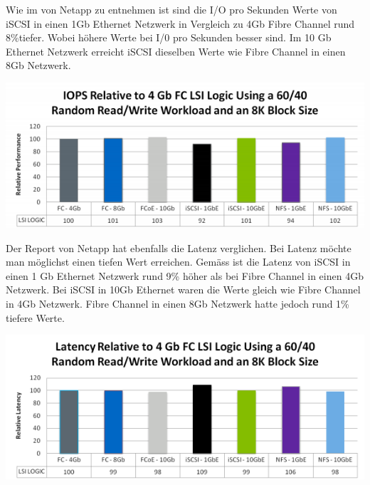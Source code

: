 Wie im  von Netapp zu entnehmen ist sind die I/O pro Sekunden Werte von iSCSI in einen 1Gb Ethernet Netzwerk in Vergleich zu 4Gb Fibre Channel rund 8\%tiefer. Wobei höhere Werte bei I/0 pro Sekunden besser sind. Im 10 Gb Ethernet Netzwerk erreicht iSCSI dieselben Werte wie Fibre Channel in einen 8Gb Netzwerk.\cite{Jafri2011}

\begin{center}
\includegraphics[width=\linewidth, keepaspectratio = true]{media/netapp_iops.png}
\end{center}

Der Report von Netapp hat ebenfalls die Latenz verglichen. Bei Latenz möchte man möglichst einen tiefen Wert erreichen. Gemäss  ist die Latenz von iSCSI in einen 1 Gb Ethernet Netzwerk rund 9\% höher als bei Fibre Channel in einen 4Gb Netzwerk. Bei iSCSI in 10Gb Ethernet waren die Werte gleich wie Fibre Channel in 4Gb Netzwerk. Fibre Channel in einen 8Gb Netzwerk hatte jedoch rund 1\% tiefere Werte.\cite{Jafri2011}

\begin{center}
\includegraphics[width=\linewidth, keepaspectratio = true]{media/netapp_latence.png}
\end{center}
 

